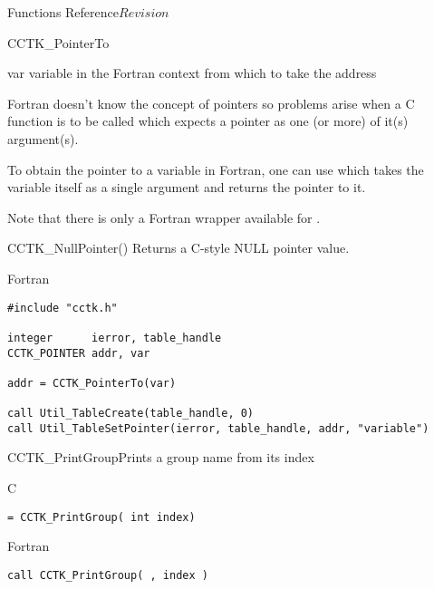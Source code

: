 \begin{cactuspart}{ Functions Reference}{}{$Revision$}
\begin{FunctionDescription}{CCTK\_PointerTo}
\begin{ParameterSection}
\begin{Parameter}{var}
variable in the Fortran context from which to take the address
\end{Parameter}
\end{ParameterSection}

\begin{Discussion}
Fortran doesn't know the concept of pointers so problems arise when a C function
is to be called which expects a pointer as one (or more) of it(s) argument(s).

To obtain the pointer to a variable in Fortran, one can use  which takes the variable itself as a single argument and returns the
pointer to it.

Note that there is only a Fortran wrapper available for .
\end{Discussion}

\begin{SeeAlsoSection}
\begin{SeeAlso}{CCTK\_NullPointer()}
Returns a C-style NULL pointer value.
\end{SeeAlso}
\end{SeeAlsoSection}

\begin{ExampleSection}
\begin{Example}{Fortran}
\begin{verbatim}
#include "cctk.h"

integer      ierror, table_handle
CCTK_POINTER addr, var

addr = CCTK_PointerTo(var)

call Util_TableCreate(table_handle, 0)
call Util_TableSetPointer(ierror, table_handle, addr, "variable")
\end{verbatim}
\end{Example}
\end{ExampleSection}
\end{FunctionDescription}


\begin{FunctionDescription}{CCTK\_PrintGroup}{Prints a group name from its index}
\label{CCTK-PrintGroup}
\begin{SynopsisSection}
\begin{Synopsis}{C}
\begin{verbatim}= CCTK_PrintGroup( int index)\end{verbatim}
\end{Synopsis}
\begin{Synopsis}{Fortran}
\begin{verbatim}call CCTK_PrintGroup( , index )


\end{verbatim}
\end{Synopsis}
\end{SynopsisSection}
\end{FunctionDescription}
\end{cactuspart}
